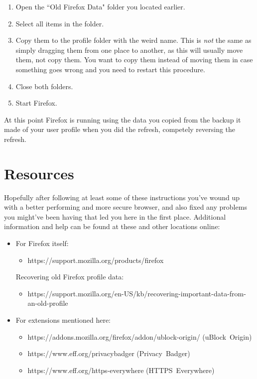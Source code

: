 \documentclass[fontsize=11pt]{article}
\begin{document}
\begin{enumerate}
	\item Open the ``Old Firefox Data" folder you located earlier.
	\item Select all items in the folder.
	\item Copy them to the profile folder with the weird name.  This is \emph{not} the same as simply dragging them from one place to another, as this will usually move them, not copy them.  You want to copy them instead of moving them in case something goes wrong and you need to restart this procedure.
	\item Close both folders.
	\item Start Firefox.
\end{enumerate}

At this point Firefox is running using the data you copied from the backup it made of your user profile when you did the refresh, competely reversing the refresh.



\section{Resources}
Hopefully after following at least some of these instructions you've wound up with a better performing and more secure browser, and also fixed any problems you might've been having that led you here in the first place.  Additional information and help can be found at these and other locations online:
\begin{itemize}
	\item For Firefox itself:
	\begin{itemize}
		\item https://support.mozilla.org/products/firefox
	\end{itemize}
	Recovering old Firefox profile data:
	\begin{itemize}
		\item https://support.mozilla.org/en-US/kb/recovering-important-data-from-an-old-profile
	\end{itemize}
	\item For extensions mentioned here:
	\begin{itemize}
		\item https://addons.mozilla.org/firefox/addon/ublock-origin/ (\mbox{uBlock Origin})
		\item https://www.eff.org/privacybadger (\mbox{Privacy Badger})
		\item https://www.eff.org/https-everywhere (\mbox{HTTPS Everywhere})
	\end{itemize}
\end{itemize}

\end{document}

